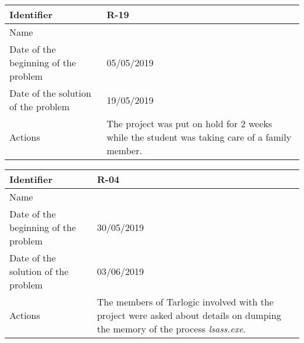 \begin{table}[H]
	\begin{tabularx}{\textwidth}{|l|X|}
		\hline
		\rowcolor{gray!30}
		Identifier & \textbf{R-19} \\ \hline
		Name & \Rdiecinueve \\ \hline
		Date of the beginning of the problem & 05/05/2019 \\ \hline
		Date of the solution of the problem & 19/05/2019 \\ \hline
		Actions & The project was put on hold for 2 weeks while the student was taking care of a family member. \\ \hline
	\end{tabularx}
\end{table}
\begin{table}[H]
	\begin{tabularx}{\textwidth}{|l|X|}
		\hline
		\rowcolor{gray!30}
		Identifier & \textbf{R-04} \\ \hline
		Name & \Rcuatro \\ \hline
		Date of the beginning of the problem & 30/05/2019 \\ \hline
		Date of the solution of the problem & 03/06/2019 \\ \hline
		Actions & The members of Tarlogic involved with the project were asked about details on dumping the memory of the process \textit{lsass.exe}. \\ \hline
	\end{tabularx}
\end{table}
